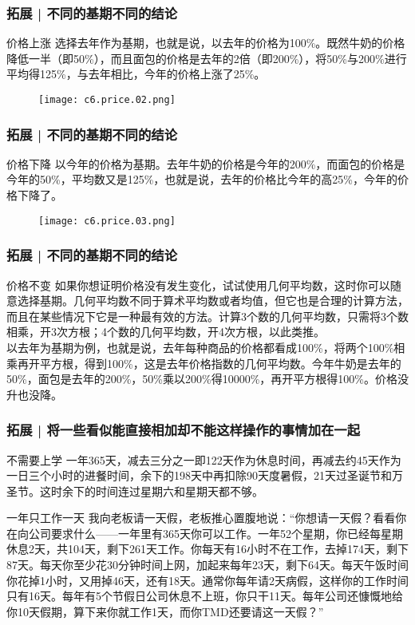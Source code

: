 \begin{frame}
  \frametitle{拓展 | 不同的基期不同的结论}
  \begin{block}{价格上涨}
 选择去年作为基期，也就是说，以去年的价格为100\%。既然牛奶的价格降低一半（即50\%），而且面包的价格是去年的2倍（即200\%），将50\%与200\%进行平均得125\%，与去年相比，今年的价格上涨了25\%。
  \end{block}
  \begin{figure}
    \centering
    \texttt{[image: c6.price.02.png]}
  \end{figure}
\end{frame}

\begin{frame}
  \frametitle{拓展 | 不同的基期不同的结论}
  \begin{block}{价格下降}
 以今年的价格为基期。去年牛奶的价格是今年的200\%，而面包的价格是今年的50\%，平均数又是125\%，也就是说，去年的价格比今年的高25\%，今年的价格下降了。
  \end{block}
  \begin{figure}
    \centering
    \texttt{[image: c6.price.03.png]}
  \end{figure}
\end{frame}

\begin{frame}
  \frametitle{拓展 | 不同的基期不同的结论}
  \begin{block}{价格不变}
    如果你想证明价格没有发生变化，试试使用几何平均数，这时你可以随意选择基期。几何平均数不同于算术平均数或者均值，但它也是合理的计算方法，而且在某些情况下它是一种最有效的方法。计算3个数的几何平均数，只需将3个数相乘，开3次方根；4个数的几何平均数，开4次方根，以此类推。\\
    \vspace{0.5em}
  以去年为基期为例，也就是说，去年每种商品的价格都看成100\%，将两个100\%相乘再开平方根，得到100\%，这是去年价格指数的几何平均数。今年牛奶是去年的50\%，面包是去年的200\%，50\%乘以200\%得10000\%，再开平方根得100\%。价格没升也没降。
  \end{block}
\end{frame}

\begin{frame}
  \frametitle{拓展 | 将一些看似能直接相加却不能这样操作的事情加在一起}
  \begin{block}{不需要上学}
一年365天，减去三分之一即122天作为休息时间，再减去约45天作为一日三个小时的进餐时间，余下的198天中再扣除90天度暑假，21天过圣诞节和万圣节。这时余下的时间连过星期六和星期天都不够。
  \end{block}
  \pause
  \begin{block}{一年只工作一天}
    我向老板请一天假，老板推心置腹地说：“你想请一天假？看看你在向公司要求什么——一年里有365天你可以工作。一年52个星期，你已经每星期休息2天，共104天，剩下261天工作。你每天有16小时不在工作，去掉174天，剩下87天。每天你至少花30分钟时间上网，加起来每年23天，剩下64天。每天午饭时间你花掉1小时，又用掉46天，还有18天。通常你每年请2天病假，这样你的工作时间只有16天。每年有5个节假日公司休息不上班，你只干11天。每年公司还慷慨地给你10天假期，算下来你就工作1天，而你TMD还要请这一天假？”
  \end{block}
\end{frame}

